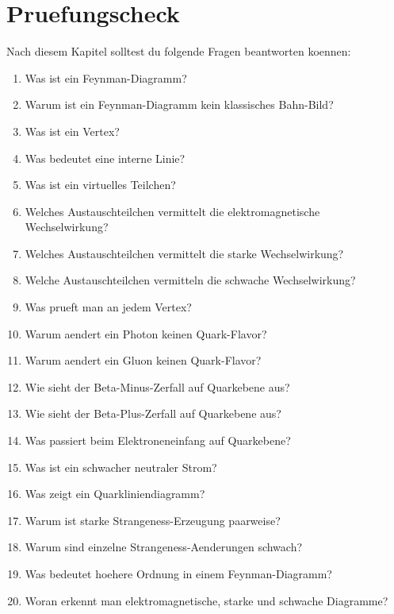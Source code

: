 \section{Pruefungscheck}

\begin{examtipbox}
Nach diesem Kapitel solltest du folgende Fragen beantworten koennen:
\begin{enumerate}
    \item Was ist ein Feynman-Diagramm?
    \item Warum ist ein Feynman-Diagramm kein klassisches Bahn-Bild?
    \item Was ist ein Vertex?
    \item Was bedeutet eine interne Linie?
    \item Was ist ein virtuelles Teilchen?
    \item Welches Austauschteilchen vermittelt die elektromagnetische Wechselwirkung?
    \item Welches Austauschteilchen vermittelt die starke Wechselwirkung?
    \item Welche Austauschteilchen vermitteln die schwache Wechselwirkung?
    \item Was prueft man an jedem Vertex?
    \item Warum aendert ein Photon keinen Quark-Flavor?
    \item Warum aendert ein Gluon keinen Quark-Flavor?
    \item Wie sieht der Beta-Minus-Zerfall auf Quarkebene aus?
    \item Wie sieht der Beta-Plus-Zerfall auf Quarkebene aus?
    \item Was passiert beim Elektroneneinfang auf Quarkebene?
    \item Was ist ein schwacher neutraler Strom?
    \item Was zeigt ein Quarkliniendiagramm?
    \item Warum ist starke Strangeness-Erzeugung paarweise?
    \item Warum sind einzelne Strangeness-Aenderungen schwach?
    \item Was bedeutet hoehere Ordnung in einem Feynman-Diagramm?
    \item Woran erkennt man elektromagnetische, starke und schwache Diagramme?
\end{enumerate}
\end{examtipbox}